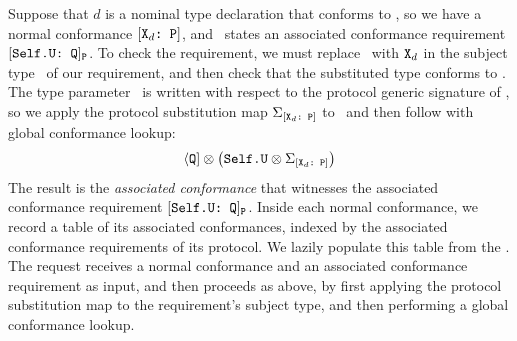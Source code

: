 \documentclass[../generics]{subfiles}
\begin{document}
Suppose that $d$ is a nominal type declaration that conforms to \tP, so we have a normal conformance $[\texttt{$\texttt{X}_d$:~P}]$, and \tP\ states an associated conformance requirement $[\texttt{Self.U:~Q}]_{\texttt{P}}$. To check the requirement, we must replace \IndexSelf\tSelf\ with $\texttt{X}_d$ in the subject type \SelfU\ of our requirement, and then check that the substituted type conforms to \tQ. The type parameter \SelfU\ is written with respect to the protocol generic signature of \tP, so we apply the protocol substitution map $\Sigma_{[\texttt{$\texttt{X}_d$:~P}]}$ to \SelfU\ and then follow with global conformance lookup:
\[
\langle\texttt{Q}] \otimes \big(\texttt{Self.U} \otimes \Sigma_{[\texttt{$\texttt{X}_d$:~P}]}\big)
\]
The result is the \emph{associated conformance} that witnesses the associated conformance requirement $[\texttt{Self.U:~Q}]_{\texttt{P}}$. Inside each normal conformance, we record a table of its associated conformances, indexed by the associated conformance requirements of its protocol. We lazily populate this table from the . The request receives a normal conformance and an associated conformance requirement as input, and then proceeds as above, by first applying the protocol substitution map to the requirement's subject type, and then performing a global conformance lookup.
\end{document}
